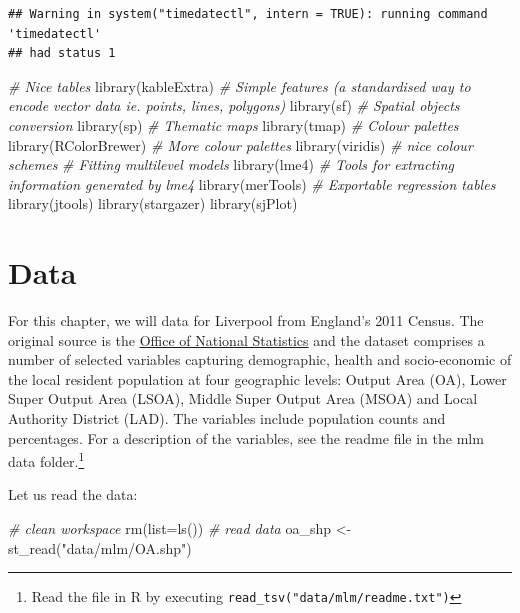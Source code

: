 \documentclass[
]{book}
\newenvironment{Shaded}{\begin{snugshade}}{\end{snugshade}}
\newcommand{\AttributeTok}[1]{\textcolor[rgb]{0.77,0.63,0.00}{#1}}
\newcommand{\CommentTok}[1]{\textcolor[rgb]{0.56,0.35,0.01}{\textit{#1}}}
\newcommand{\FunctionTok}[1]{\textcolor[rgb]{0.00,0.00,0.00}{#1}}
\newcommand{\NormalTok}[1]{#1}
\newcommand{\OtherTok}[1]{\textcolor[rgb]{0.56,0.35,0.01}{#1}}
\newcommand{\StringTok}[1]{\textcolor[rgb]{0.31,0.60,0.02}{#1}}
\begin{document}
\begin{verbatim}
## Warning in system("timedatectl", intern = TRUE): running command 'timedatectl'
## had status 1
\end{verbatim}

\begin{Shaded}
\begin{Highlighting}[]
\CommentTok{\# Nice tables}
\FunctionTok{library}\NormalTok{(kableExtra)}
\CommentTok{\# Simple features (a standardised way to encode vector data ie. points, lines, polygons)}
\FunctionTok{library}\NormalTok{(sf) }
\CommentTok{\# Spatial objects conversion}
\FunctionTok{library}\NormalTok{(sp) }
\CommentTok{\# Thematic maps}
\FunctionTok{library}\NormalTok{(tmap) }
\CommentTok{\# Colour palettes}
\FunctionTok{library}\NormalTok{(RColorBrewer) }
\CommentTok{\# More colour palettes}
\FunctionTok{library}\NormalTok{(viridis) }\CommentTok{\# nice colour schemes}
\CommentTok{\# Fitting multilevel models}
\FunctionTok{library}\NormalTok{(lme4)}
\CommentTok{\# Tools for extracting information generated by lme4}
\FunctionTok{library}\NormalTok{(merTools)}
\CommentTok{\# Exportable regression tables}
\FunctionTok{library}\NormalTok{(jtools)}
\FunctionTok{library}\NormalTok{(stargazer)}
\FunctionTok{library}\NormalTok{(sjPlot)}
\end{Highlighting}
\end{Shaded}

\hypertarget{data-4}{%
\section{Data}\label{data-4}}

For this chapter, we will data for Liverpool from England's 2011 Census. The original source is the \href{https://www.nomisweb.co.uk/home/census2001.asp}{Office of National Statistics} and the dataset comprises a number of selected variables capturing demographic, health and socio-economic of the local resident population at four geographic levels: Output Area (OA), Lower Super Output Area (LSOA), Middle Super Output Area (MSOA) and Local Authority District (LAD). The variables include population counts and percentages. For a description of the variables, see the readme file in the mlm data folder.\footnote{Read the file in R by executing \texttt{read\_tsv("data/mlm/readme.txt")}}

Let us read the data:

\begin{Shaded}
\begin{Highlighting}[]
\CommentTok{\# clean workspace}
\FunctionTok{rm}\NormalTok{(}\AttributeTok{list=}\FunctionTok{ls}\NormalTok{())}
\CommentTok{\# read data}
\NormalTok{oa\_shp }\OtherTok{\textless{}{-}} \FunctionTok{st\_read}\NormalTok{(}\StringTok{"data/mlm/OA.shp"}\NormalTok{)}
\end{Highlighting}
\end{Shaded}
\end{document}
